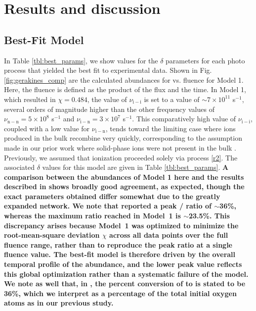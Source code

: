 \documentclass[journal=aesccq,manuscript=article,layout=twocolumn]{achemso}
\DeclareRobustCommand{\cb}[1]{\textbf{\textcolor{codexblue}{#1}}}
\begin{document}
\section{Results and discussion} \label{sec:results}

\subsection{Best-Fit Model}

In Table \ref{tbl:best_params}, we show values for the $\delta$ parameters for each photo process that yielded the best fit to experimental data. Shown in Fig. \ref{fig:gerakines_comp} are the calculated abundances for  vs. fluence for Model 1. Here, the fluence is defined as the product of the flux and the time. In Model 1, which resulted in \cb{$\chi = 0.484$}, the value of $\nu_\mathrm{i-i}$ is set to a value of $\sim7\times10^{11}$ s$^{-1}$, several orders of magnitude higher than the other frequency values of $\nu_\mathrm{n-n}=5\times10^{8}$ s$^{-1}$ and $\nu_\mathrm{i-n}=3\times10^7$ s$^{-1}$. This comparatively high value of $\nu_\mathrm{i-i}$, coupled with a low value for $\nu_\mathrm{i-n}$, tends toward the limiting case where ions produced in the bulk recombine very quickly, corresponding to the assumption made in our prior work where solid-phase ions were not present in the bulk \citep{shingledecker_general_2018,shingledecker_efficient_2020,mullikin_new_2021}. Previously, we assumed that ionization proceeded solely via process \eqref{r2}. The associated $\delta$ values for this model are given in Table \ref{tbl:best_params}. \cb{A comparison between the abundances of Model 1 here and the results described in \citet{mullikin_new_2021} shows broadly good agreement, as expected, though the exact parameters obtained differ somewhat due to the greatly expanded network. We note that \citet{gerakines_ultraviolet_1996} reported a peak \ce{O3}/\ce{O2} ratio of $\sim$36\%, whereas the maximum ratio reached in Model~1 is $\sim$23.5\%. This discrepancy arises because Model~1 was optimized to minimize the root-mean-square deviation $\chi$ across all data points over the full fluence range, rather than to reproduce the peak ratio at a single fluence value. The best-fit model is therefore driven by the overall temporal profile of the \ce{O3} abundance, and the lower peak value reflects this global optimization rather than a systematic failure of the model. We note as well that, in \citet{gerakines_ultraviolet_1996}, the percent conversion of \ce{O2} to \ce{O3} is stated to be 36\%, which we interpret as a percentage of the total initial oxygen atoms as in our previous study\citep{mullikin_new_2021}.}
\end{document}
